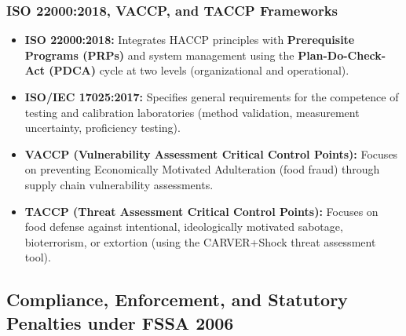 \documentclass[11pt,a4paper,oneside]{article}
\begin{document}
\subsubsection{ISO 22000:2018, VACCP, and TACCP Frameworks}
\begin{itemize}[leftmargin=*]
    \item \textbf{ISO 22000:2018:} Integrates HACCP principles with \textbf{Prerequisite Programs (PRPs)} and system management using the \textbf{Plan-Do-Check-Act (PDCA)} cycle at two levels (organizational and operational).
    \item \textbf{ISO/IEC 17025:2017:} Specifies general requirements for the competence of testing and calibration laboratories (method validation, measurement uncertainty, proficiency testing).
    \item \textbf{VACCP (Vulnerability Assessment Critical Control Points):} Focuses on preventing Economically Motivated Adulteration (food fraud) through supply chain vulnerability assessments.
    \item \textbf{TACCP (Threat Assessment Critical Control Points):} Focuses on food defense against intentional, ideologically motivated sabotage, bioterrorism, or extortion (using the CARVER+Shock threat assessment tool).
\end{itemize}

\subsection{Compliance, Enforcement, and Statutory Penalties under FSSA 2006}
\end{document}
